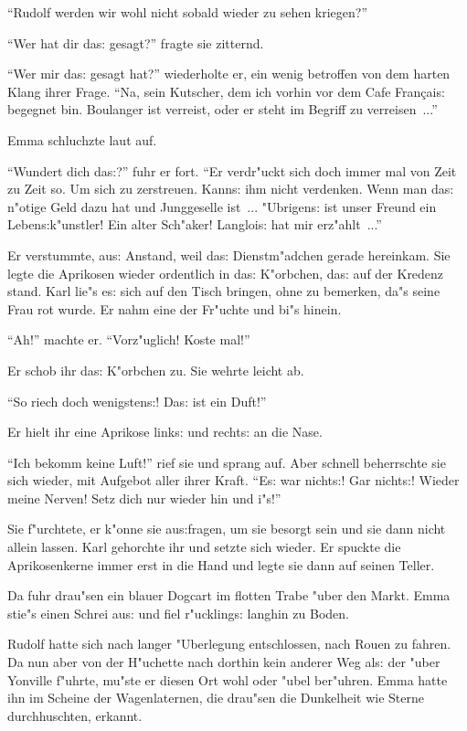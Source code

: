 \documentclass[oneside,12pt]{book}
\newcommand{\s}{s:}%
\begin{document}
"`Rudolf werden wir wohl nicht sobald wieder zu sehen kriegen?"'

"`Wer hat dir da{\s} gesagt?"' fragte sie zitternd.

"`Wer mir da{\s} gesagt hat?"' wiederholte er, ein wenig betroffen
von dem harten Klang ihrer Frage. "`Na, sein Kutscher, dem ich
vorhin vor dem Cafe Fran\c{c}ai{\s} begegnet bin. Boulanger ist
verreist, oder er steht im Begriff zu verreisen~..."'

Emma schluchzte laut auf.

"`Wundert dich da{\s}?"' fuhr er fort. "`Er verdr"uckt sich doch
immer mal von Zeit zu Zeit so. Um sich zu zerstreuen. Kann{\s} ihm
nicht verdenken. Wenn man da{\s} n"otige Geld dazu hat und
Junggeselle ist~... "Ubrigen{\s} ist unser Freund ein
Leben{\s}k"unstler! Ein alter Sch"aker! Langloi{\s} hat mir
erz"ahlt~..."'

Er verstummte, au{\s} Anstand, weil da{\s} Dienstm"adchen gerade
hereinkam. Sie legte die Aprikosen wieder ordentlich in da{\s}
K"orbchen, da{\s} auf der Kredenz stand. Karl lie"s e{\s} sich auf
den Tisch bringen, ohne zu bemerken, da"s seine Frau rot wurde. Er
nahm eine der Fr"uchte und bi"s hinein.

"`Ah!"' machte er. "`Vorz"uglich! Koste mal!"'

Er schob ihr da{\s} K"orbchen zu. Sie wehrte leicht ab.

"`So riech doch wenigsten{\s}! Da{\s} ist ein Duft!"'

Er hielt ihr eine Aprikose link{\s} und recht{\s} an die Nase.

"`Ich bekomm keine Luft!"' rief sie und sprang auf. Aber schnell
beherrschte sie sich wieder, mit Aufgebot aller ihrer Kraft.
"`E{\s} war nicht{\s}! Gar nicht{\s}! Wieder meine Nerven! Setz
dich nur wieder hin und i"s!"'

Sie f"urchtete, er k"onne sie au{\s}fragen, um sie besorgt sein
und sie dann nicht allein lassen. Karl gehorchte ihr und setzte
sich wieder. Er spuckte die Aprikosenkerne immer erst in die Hand
und legte sie dann auf seinen Teller.

Da fuhr drau"sen ein blauer Dogcart im flotten Trabe "uber den
Markt. Emma stie"s einen Schrei au{\s} und fiel r"uckling{\s}
langhin zu Boden.

Rudolf hatte sich nach langer "Uberlegung entschlossen, nach Rouen
zu fahren. Da nun aber von der H"uchette nach dorthin kein anderer
Weg al{\s} der "uber Yonville f"uhrte, mu"ste er diesen Ort wohl
oder "ubel ber"uhren. Emma hatte ihn im Scheine der Wagenlaternen,
die drau"sen die Dunkelheit wie Sterne durchhuschten, erkannt.
\end{document}
